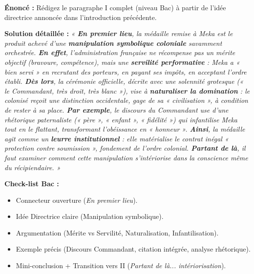 \documentclass[11pt]{article}
\begin{document}
\begin{exoresolu}
\textbf{Énoncé :} Rédigez le paragraphe I complet (niveau Bac) à partir de l'idée directrice annoncée dans l'introduction précédente.

\tcblower
\textbf{Solution détaillée :}
\emph{« \textbf{En premier lieu}, la médaille remise à Meka est le produit achevé d'une \textbf{manipulation symbolique coloniale} savamment orchestrée. \textbf{En effet}, l'administration française ne récompense pas un mérite objectif (bravoure, compétence), mais une \textbf{servilité performative} : Meka a « bien servi » en recrutant des porteurs, en payant ses impôts, en acceptant l'ordre établi. \textbf{Dès lors}, la cérémonie officielle, décrite avec une solennité grotesque (\emph{« le Commandant, très droit, très blanc »}), vise à \textbf{naturaliser la domination} : le colonisé reçoit une distinction occidentale, gage de sa « civilisation », à condition de rester à sa place. \textbf{Par exemple}, le discours du Commandant use d'une rhétorique paternaliste (\emph{« père », « enfant », « fidélité »}) qui infantilise Meka tout en le flattant, transformant l'obéissance en « honneur ». \textbf{Ainsi}, la médaille agit comme un \textbf{leurre institutionnel} : elle matérialise le contrat inégal « protection contre soumission », fondement de l'ordre colonial. \textbf{Partant de là}, il faut examiner comment cette manipulation s'intériorise dans la conscience même du récipiendaire. »}

\textbf{Check-list Bac :}
\begin{itemize}
    \item [✓] Connecteur ouverture (\emph{En premier lieu}).
    \item [✓] Idée Directrice claire (Manipulation symbolique).
    \item [✓] Argumentation (Mérite vs Servilité, Naturalisation, Infantilisation).
    \item [✓] Exemple précis (Discours Commandant, citation intégrée, analyse rhétorique).
    \item [✓] Mini-conclusion + Transition vers II (\emph{Partant de là... intériorisation}).
\end{itemize}
\end{exoresolu}
\end{document}
